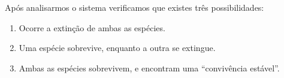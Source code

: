 





\medskip\noindent Após analisarmos o sistema verificamos que existes três possibilidades:
\begin{enumerate}[ {(}1{)} ]
\item Ocorre a extinção de ambas as espécies.
\item Uma espécie sobrevive, enquanto a outra se extingue.
\item Ambas as espécies sobrevivem, e encontram uma “convivência estável”.
\end{enumerate}


